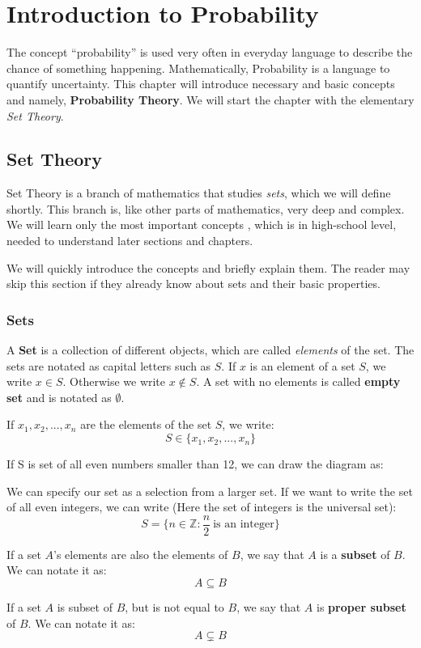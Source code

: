 \chapter{Introduction to Probability}
The concept ``probability'' is used very often in everyday language to describe the chance of something happening. Mathematically, Probability is a language to quantify uncertainty. 
This chapter will introduce necessary and basic concepts and namely, \textbf{Probability Theory}. We will start the chapter with the elementary \textit{Set Theory}.
\section{Set Theory}
Set Theory is a branch of mathematics that studies \textit{sets}, which we will define shortly. This branch is, like other parts of mathematics, very deep and complex. We will learn only the most important concepts , which is in high-school level, needed to understand later sections and chapters.
\par
We will quickly introduce the concepts and briefly explain them. The reader may skip this section if they already know about sets and their basic properties.

\subsection*{Sets}
A \textbf{Set} is a collection of different objects, which are called \textit{elements} of the set. The sets are notated as capital letters such as $S$.
If $x$ is an element of a set $S$, we write $x \in S$. Otherwise we write $ x \not\in S$. A set with no elements is called \textbf{empty set} and is notated as $\emptyset$. \par
If $x_1,x_2,...,x_n$ are the elements of the set $S$, we write:
$$ S \in \{x_1,x_2,...,x_n\} $$
\par
If S is set of all even numbers smaller than 12, we can draw the diagram as:



We can specify our set  as a selection from a larger set. If we want to write the set of all even integers, we can write (Here the set of integers is the universal set):
$$ S = \{n \in \mathbb{Z}: \frac{n}{2} \ \text{is an integer} \}$$
\par 
If a set $A$'s elements are also the elements of $B$, we say that $A$ is a \textbf{subset} of $B$. We can notate it as:
$$ A \subseteq B $$
\par
If a set $A$ is subset of $B$, but is not equal to $B$, we say that $A$ is \textbf{proper subset} of $B$. We can notate it as:
$$A \subsetneq B$$

